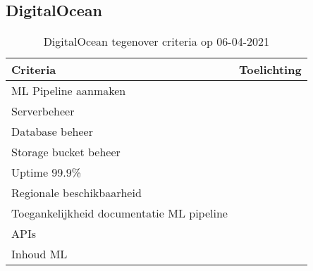 \subsection*{DigitalOcean}\label{appendix:detailed-overview-of-cloud-computing-platforms:digitalocean}
\begin{table}[hbt!]
  \centering
  \begin{tabular}{|p{.2\linewidth}|p{.74\linewidth}|}
  \hline
  \textbf{Criteria} & \textbf{Toelichting} \\ \hline
    ML Pipeline \newline aanmaken
    &

    \\ \hline

    Serverbeheer
    &

    \\ \hline

    Database beheer
    &

    \\ \hline

    Storage \newline bucket beheer
    &

    \\ \hline

    Uptime 99.9\%
    &

    \\ \hline

    Regionale \newline beschikbaarheid
    &

    \\ \hline

    Toegankelijkheid documentatie ML pipeline
    &

    \\ \hline

    APIs
    &

    \\ \hline

    Inhoud ML
    &

    \\ \hline
  \end{tabular}
  \caption{DigitalOcean tegenover criteria op 06-04-2021}
  \label{table:digitalocean-against-criteria}
\end{table}

\newpage


